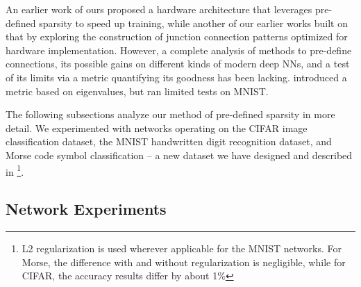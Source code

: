 \documentclass[conference]{IEEEtran}
\begin{document}
An earlier work of ours \cite{Dey2017_ICANN} proposed a hardware architecture that leverages pre-defined sparsity to speed up training, while another of our earlier works \cite{Dey2017_Asilomar} built on that by exploring the construction of junction connection patterns optimized for hardware implementation. However, a complete analysis of methods to pre-define connections, its possible gains on different kinds of modern deep NNs, and a test of its limits via a metric quantifying its goodness has been lacking. \cite{Bourely2017} introduced a metric based on eigenvalues, but ran limited tests on MNIST.

The following subsections analyze our method of pre-defined sparsity in more detail. We experimented with networks operating on the CIFAR image classification dataset, the MNIST handwritten digit recognition dataset, and %
Morse code symbol classification -- a new dataset we have designed and described in \cite{Dey2017_morseblog}\footnote{L2 regularization is used wherever applicable for the MNIST networks. For Morse, the difference with and without regularization is negligible, while for CIFAR, the accuracy results differ by about 1\%}.


\subsection{Network Experiments}\label{netexp}
\end{document}

